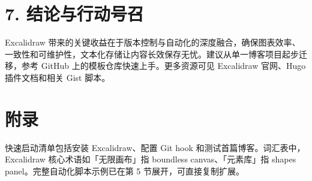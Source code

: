 \chapter{7. 结论与行动号召}
Excalidraw 带来的关键收益在于版本控制与自动化的深度融合，确保图表效率、一致性和可维护性，文本化存储让内容长效保存无忧。建议从单一博客项目起步迁移，参考 GitHub 上的模板仓库快速上手。更多资源可见 Excalidraw 官网、Hugo 插件文档和相关 Gist 脚本。\par
\chapter{附录}
快速启动清单包括安装 Excalidraw、配置 Git hook 和测试首篇博客。词汇表中，Excalidraw 核心术语如「无限画布」指 boundless canvas、「元素库」指 shapes panel。完整自动化脚本示例已在第 5 节展开，可直接复制扩展。\par
